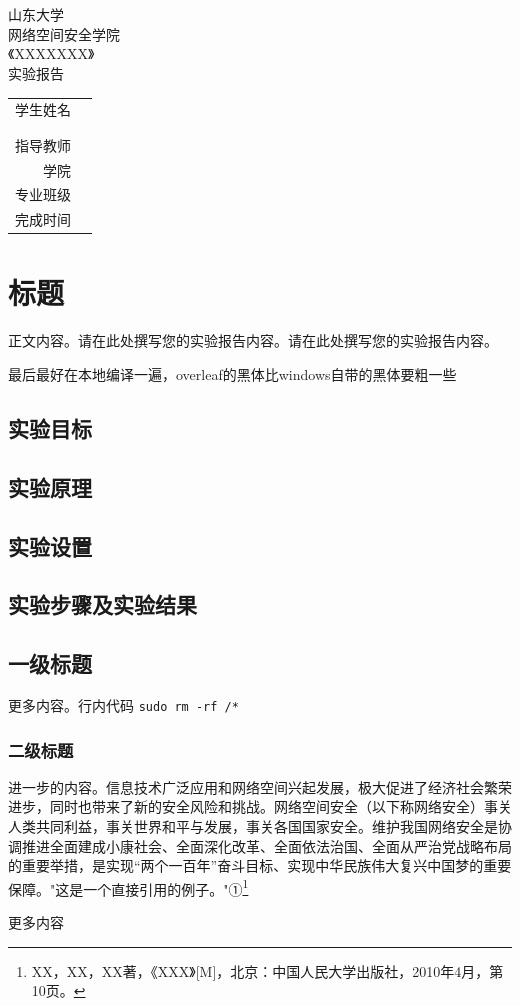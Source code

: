 \documentclass[a4paper,12pt]{ctexart} %
\newcommand{\subsubsubsection}[1]{%
    \par\vspace{0.5\baselineskip} %
    \noindent\hspace{1.25em}{\zihao{4}\heiti #1} 
    \par\vspace{0.5\baselineskip} %
}
\newcommand{\makecover}{
    \begin{center}
        ~\\
        ~\\
        {\heiti\zihao{-0} 山东大学}\\[0.5cm]
        {\heiti\zihao{-0} 网络空间安全学院}\\[3cm]
        {\heiti\zihao{-0} 《XXXXXXX》}\\[1cm]
        {\heiti\zihao{-0} 实验报告}\\[4.5cm]

        \begin{tabular}{>{\heiti\zihao{-3}}r p{10cm}}
            学生姓名 & \underline{\makebox[10cm][c]{XXX（学号：YYYY）}} \\[0.35cm]
             & \underline{\makebox[10cm][c]{XXX（学号：YYYY）}} \\[0.35cm]
             & \underline{\makebox[10cm][c]{XXX（学号：YYYY）}} \\[0.35cm]
            指导教师 & \underline{\makebox[10cm][c]{XXXXXXXXXXXXXXXXXXXXXX}} \\[0.35cm]
            学\hspace{2em}院 & \underline{\makebox[10cm][c]{XXXXXXXXXXXXXXXXXXXXX}} \\[0.35cm]
            专业班级 & \underline{\makebox[10cm][c]{XXXXXXXXXXXXXXXXXX}} \\[0.35cm]
            完成时间 & \underline{\makebox[10cm][c]{XXXX年XX月XX日}} \\
        \end{tabular}
    \end{center}
    \thispagestyle{empty} %
    \newpage %
}
\begin{document}
\makecover


\newpage
\tableofcontents
\setcounter{page}{0}
\clearpage
{} %


\section{标题}
正文内容。请在此处撰写您的实验报告内容。请在此处撰写您的实验报告内容。

最后最好在本地编译一遍，overleaf的黑体比windows自带的黑体要粗一些

\subsection{实验目标}

\subsection{实验原理}

\subsection{实验设置}

\subsection{实验步骤及实验结果}

\subsection{一级标题}
更多内容。行内代码 \verb|sudo rm -rf /*|

\subsubsection{二级标题}
进一步的内容。信息技术广泛应用和网络空间兴起发展，极大促进了经济社会繁荣进步，同时也带来了新的安全风险和挑战。网络空间安全（以下称网络安全）事关人类共同利益，事关世界和平与发展，事关各国国家安全。维护我国网络安全是协调推进全面建成小康社会、全面深化改革、全面依法治国、全面从严治党战略布局的重要举措，是实现“两个一百年”奋斗目标、实现中华民族伟大复兴中国梦的重要保障。"这是一个直接引用的例子。"①\footnote{XX，XX，XX著，《XXX》[M]，北京：中国人民大学出版社，2010年4月，第10页。}


\subsubsubsection{三级标题}
更多内容
\end{document}
